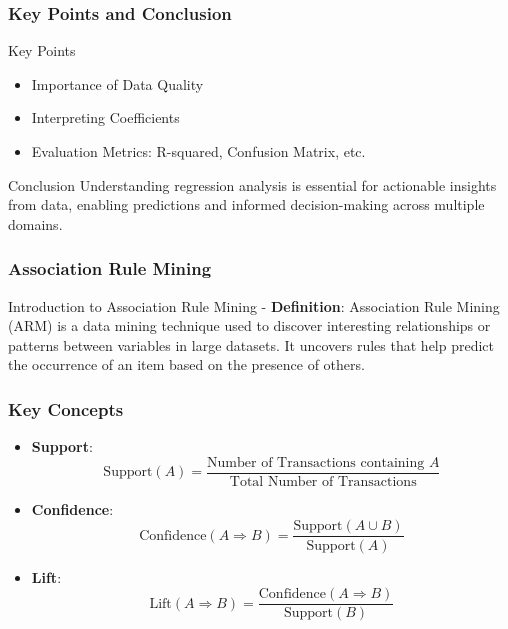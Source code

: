 \documentclass[aspectratio=169]{beamer}
\begin{document}
\begin{frame}[fragile]
    \frametitle{Key Points and Conclusion}
    \begin{block}{Key Points}
        \begin{itemize}
            \item Importance of Data Quality
            \item Interpreting Coefficients
            \item Evaluation Metrics: R-squared, Confusion Matrix, etc.
        \end{itemize}
    \end{block}

    \begin{block}{Conclusion}
        Understanding regression analysis is essential for actionable insights from data, enabling predictions and informed decision-making across multiple domains.
    \end{block}
\end{frame}

\begin{frame}[fragile]
    \frametitle{Association Rule Mining}
    \begin{block}{Introduction to Association Rule Mining}
        - \textbf{Definition}: Association Rule Mining (ARM) is a data mining technique used to discover interesting relationships or patterns between variables in large datasets.
        \newline
        It uncovers rules that help predict the occurrence of an item based on the presence of others.
    \end{block}
\end{frame}

\begin{frame}[fragile]
    \frametitle{Key Concepts}
    \begin{itemize}
        \item \textbf{Support}:
        \begin{equation}
          \text{Support}(A) = \frac{\text{Number of Transactions containing } A}{\text{Total Number of Transactions}}
        \end{equation}
        \item \textbf{Confidence}:
        \begin{equation}
          \text{Confidence}(A \Rightarrow B) = \frac{\text{Support}(A \cup B)}{\text{Support}(A)}
        \end{equation}
        \item \textbf{Lift}:
        \begin{equation}
          \text{Lift}(A \Rightarrow B) = \frac{\text{Confidence}(A \Rightarrow B)}{\text{Support}(B)}
        \end{equation}
    \end{itemize}
\end{frame}
\end{document}
